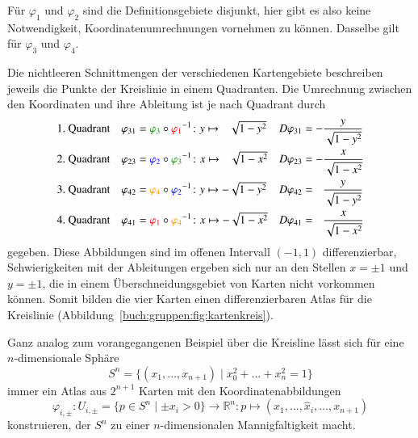 \begin{beispiel}
Für $\varphi_1$ und $\varphi_2$ sind die Definitionsgebiete disjunkt,
hier gibt es also keine Notwendigkeit, Koordinatenumrechnungen vornehmen
zu können.
Dasselbe gilt für $\varphi_3$ und $\varphi_4$.

Die nichtleeren Schnittmengen der verschiedenen Kartengebiete beschreiben
jeweils die Punkte der Kreislinie in einem Quadranten.
Die Umrechnung zwischen den Koordinaten und ihre Ableitung
ist je nach Quadrant durch
\begin{align*}
&\text{1.~Quadrant}&
\varphi_{31}
&=
{\color{darkgreen}\varphi_3}\circ{\color{red}\varphi_1}^{-1}
\colon
y\mapsto\phantom{-}{\textstyle\sqrt{1-y^2\mathstrut}}
&
D\varphi_{31}
&=
-\frac{y}{\sqrt{1-y^2\mathstrut}}
\\
&\text{2.~Quadrant}&
\varphi_{23}
&=
{\color{blue}\varphi_2}\circ{\color{darkgreen}\varphi_3}^{-1}
\colon
x\mapsto\phantom{-}{\textstyle\sqrt{1-x^2\mathstrut}}
&
D\varphi_{23}
&=
-\frac{x}{\sqrt{1-x^2\mathstrut}}
\\
&\text{3.~Quadrant}&
\varphi_{42}
&=
{\color{orange}\varphi_4}\circ{\color{blue}\varphi_2}^{-1}
\colon
y\mapsto-{\textstyle\sqrt{1-y^2\mathstrut}}
&
D\varphi_{42}
&=
\phantom{-}\frac{y}{\sqrt{1-y^2\mathstrut}}
\\
&\text{4.~Quadrant}&
\varphi_{41}
&=
{\color{red}\varphi_1}\circ{\color{orange}\varphi_4}^{-1}
\colon
x\mapsto-{\textstyle\sqrt{1-x^2\mathstrut}}
&
D\varphi_{41}
&=
\phantom{-}\frac{x}{\sqrt{1-x^2\mathstrut}}
\end{align*}
gegeben.
Diese Abbildungen sind im offenen Intervall $(-1,1)$ differenzierbar,
Schwierigkeiten mit der Ableitungen ergeben sich nur an den Stellen
$x=\pm1$ und $y=\pm 1$, die in einem Überschneidungsgebiet von Karten
nicht vorkommen können.
Somit bilden die vier Karten einen differenzierbaren Atlas für
die Kreislinie (Abbildung~\ref{buch:gruppen:fig:kartenkreis}).
\end{beispiel}

\begin{beispiel}
Ganz analog zum vorangegangenen Beispiel über die Kreisline lässt sich
für eine $n$-di\-men\-sio\-nale Sphäre
\[
S^n = \{ (x_1,\dots,x_{n+1}) \mid x_0^2+\dots+x_n^2=1\}
\]
immer ein Atlas aus $2^{n+1}$ Karten mit den Koordinatenabbildungen
\[
\varphi_{i,\pm}
\colon
U_{i,\pm}
=
\{p\in S^n \mid \pm x_i >0\}
\to
\mathbb{R}^n
:
p\mapsto (x_1,\dots,\hat{x}_i,\dots,x_{n+1})
\]
konstruieren, der $S^n$ zu einer $n$-dimensionalen Mannigfaltigkeit macht.
\end{beispiel}

